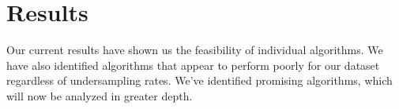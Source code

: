 \documentclass[fleqn,moreauthors,10pt]{ds_report}
\begin{document}

\section*{Results}

 Our current results have shown us the feasibility of individual algorithms. We have also identified algorithms that appear to perform poorly for our dataset regardless of undersampling rates. We've identified promising algorithms, which will now be analyzed in greater depth.




\end{document}
